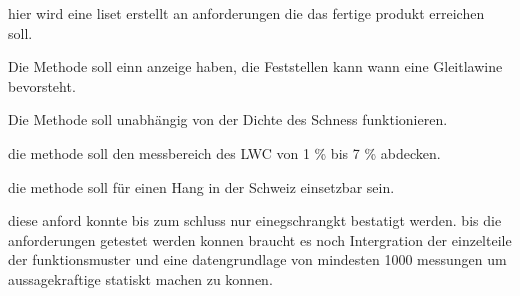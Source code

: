 hier wird eine liset erstellt an anforderungen die das fertige produkt erreichen soll.

Die Methode soll einn anzeige haben, die Feststellen kann wann eine Gleitlawine bevorsteht.

Die Methode soll unabhängig von der Dichte des Schness funktionieren.

die methode soll den messbereich des LWC von 1 \% bis 7 \% abdecken.

die methode soll für einen Hang in der Schweiz einsetzbar sein.

diese anford konnte bis zum schluss nur einegschrangkt bestatigt werden. bis die anforderungen getestet werden konnen braucht es noch Intergration der einzelteile der funktionsmuster und eine datengrundlage von mindesten 1000 messungen um aussagekraftige statiskt machen zu konnen.
